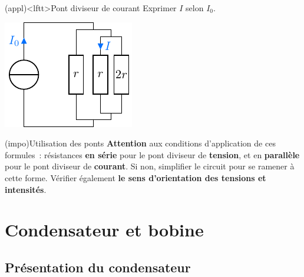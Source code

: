 \documentclass[../../main/main.tex]{subfiles}
\begin{document}
\begin{tcb*}[breakable, sidebyside, lefthand ratio=.3](appl)<lftt>{Pont diviseur de courant}
	Exprimer $I$ selon $I_0$.
	\begin{center}
		\includegraphics[scale=1]{divcour_last-plain}
	\end{center}
	\tcblower
	\begin{isd}
		\tcblower
	\end{isd}
\end{tcb*}

\begin{tcb*}[label=impo:ponts](impo){Utilisation des ponts}
	\textbf{Attention} aux conditions d'application de ces formules~: résistances
	\textbf{en série} pour le pont diviseur de \textbf{tension}, et en
	\textbf{parallèle} pour le pont diviseur de \textbf{courant}.
	\smallbreak
	Si non, simplifier le circuit pour se ramener à cette forme. Vérifier
	également \textbf{le sens d'orientation des tensions et intensités}.
\end{tcb*}

\section{Condensateur et bobine}
\subsection{Présentation du condensateur}
\end{document}
